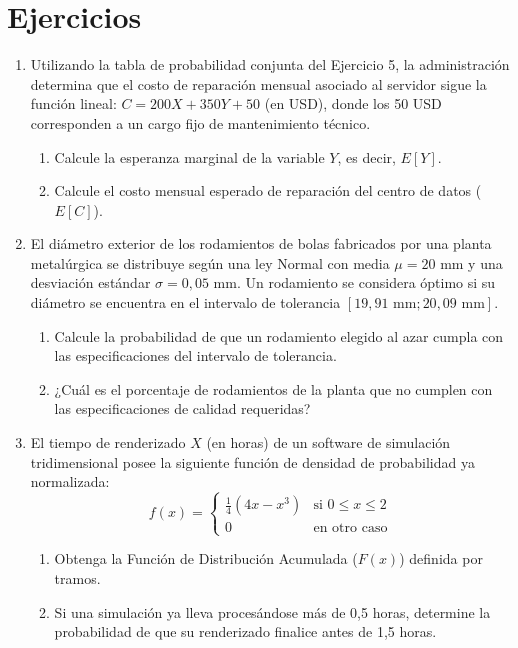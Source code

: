\documentclass[letterpaper,12pt]{article}
\newenvironment{ejercicios}{%
    \section*{Ejercicios}
}{}
\begin{document}
\begin{ejercicios}
\begin{enumerate}[leftmargin=*,itemsep=0.8em]
    \item Utilizando la tabla de probabilidad conjunta del Ejercicio 5, la administración determina que el costo de reparación mensual asociado al servidor sigue la función lineal: $C = 200X + 350Y + 50$ (en USD), donde los 50 USD corresponden a un cargo fijo de mantenimiento técnico.
    \begin{enumerate}[label=\alph*)]
        \item Calcule la esperanza marginal de la variable $Y$, es decir, $E[Y]$.
        \item Calcule el costo mensual esperado de reparación del centro de datos ($E[C]$).
    \end{enumerate}

    \item El diámetro exterior de los rodamientos de bolas fabricados por una planta metalúrgica se distribuye según una ley Normal con media $\mu = 20$ mm y una desviación estándar $\sigma = 0,05$ mm. Un rodamiento se considera óptimo si su diámetro se encuentra en el intervalo de tolerancia $[19,91 \text{ mm}; 20,09 \text{ mm}]$.
    \begin{enumerate}[label=\alph*)]
        \item Calcule la probabilidad de que un rodamiento elegido al azar cumpla con las especificaciones del intervalo de tolerancia.
        \item ¿Cuál es el porcentaje de rodamientos de la planta que no cumplen con las especificaciones de calidad requeridas? 
    \end{enumerate}

    \item El tiempo de renderizado $X$ (en horas) de un software de simulación tridimensional posee la siguiente función de densidad de probabilidad ya normalizada:
    $$f(x) = \begin{cases} \frac{1}{4}(4x - x^3) & \text{si } 0 \leq x \leq 2 \\ 0 & \text{en otro caso} \end{cases}$$
    \begin{enumerate}[label=\alph*)]
        \item Obtenga la Función de Distribución Acumulada ($F(x)$) definida por tramos.
        \item Si una simulación ya lleva procesándose más de 0,5 horas, determine la probabilidad de que su renderizado finalice antes de 1,5 horas.
    \end{enumerate}


\end{enumerate}
\end{ejercicios}
\end{document}
